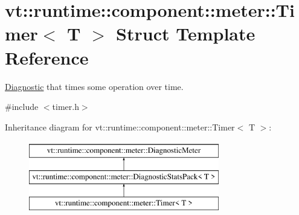 \hypertarget{structvt_1_1runtime_1_1component_1_1meter_1_1_timer}{}\section{vt\+:\+:runtime\+:\+:component\+:\+:meter\+:\+:Timer$<$ T $>$ Struct Template Reference}
\label{structvt_1_1runtime_1_1component_1_1meter_1_1_timer}


\hyperlink{structvt_1_1runtime_1_1component_1_1_diagnostic}{Diagnostic} that times some operation over time.  




{\ttfamily \#include $<$timer.\+h$>$}

Inheritance diagram for vt\+:\+:runtime\+:\+:component\+:\+:meter\+:\+:Timer$<$ T $>$\+:\begin{figure}[H]
\begin{center}
\leavevmode
\includegraphics[height=3.000000cm]{structvt_1_1runtime_1_1component_1_1meter_1_1_timer}
\end{center}
\end{figure}
